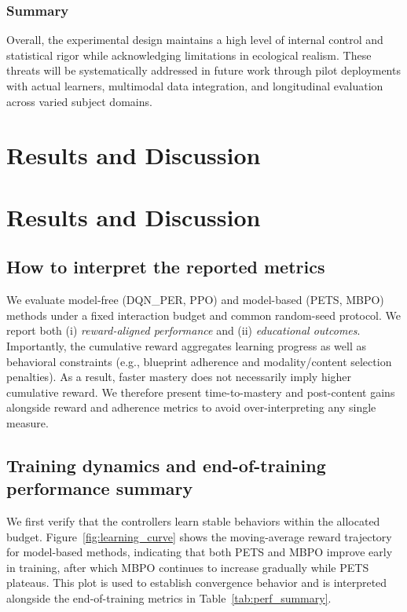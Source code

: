 \documentclass[preprint,12pt]{elsarticle}
\begin{document}
\begin{frontmatter}
\subsubsection{Summary}
Overall, the experimental design maintains a high level of internal control and statistical rigor while acknowledging limitations in ecological realism.  
These threats will be systematically addressed in future work through pilot deployments with actual learners, multimodal data integration, and longitudinal evaluation across varied subject domains.

\section{Results and Discussion}



\section{Results and Discussion}
\label{sec:results}

\subsection{How to interpret the reported metrics}
\label{subsec:metric_interpretation}
We evaluate model-free (DQN\_PER, PPO) and model-based (PETS, MBPO) methods under a fixed interaction budget and common random-seed protocol. We report both (i) \emph{reward-aligned performance} and (ii) \emph{educational outcomes}. Importantly, the cumulative reward aggregates learning progress as well as behavioral constraints (e.g., blueprint adherence and modality/content selection penalties). As a result, faster mastery does not necessarily imply higher cumulative reward. We therefore present time-to-mastery and post-content gains alongside reward and adherence metrics to avoid over-interpreting any single measure.

\subsection{Training dynamics and end-of-training performance summary}
\label{subsec:training_summary}
We first verify that the controllers learn stable behaviors within the allocated budget. Figure~\ref{fig:learning_curve} shows the moving-average reward trajectory for model-based methods, indicating that both PETS and MBPO improve early in training, after which MBPO continues to increase gradually while PETS plateaus. This plot is used to establish convergence behavior and is interpreted alongside the end-of-training metrics in Table~\ref{tab:perf_summary}.


\end{frontmatter}
\end{document}
